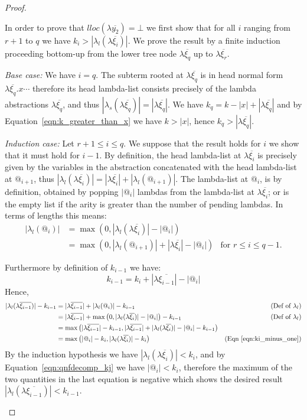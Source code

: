 \documentclass{article}
\theoremstyle{definition}
\begin{document}
\begin{proof}
\begin{enumerate}
In order to prove that $lloc(\lambda\overline{y_2}) =\bot$ we first show that for all $i$ ranging from $r+1$ to $q$ we have
 $k_i>|\lambda_l(\lambda\overline{\xi_i})|$. We prove the result by a finite induction proceeding bottom-up from the lower tree node
 $\lambda\overline{\xi_q}$ up to $\lambda\overline{\xi_r}$.

\emph{Base case:} We have $i=q$. The subterm
rooted at $\lambda\overline{\xi_q}$ is in head normal form
$\lambda\overline{\xi_q}. x \cdots$ therefore its head lambda-list consists precisely of the lambda abstractions $\lambda\overline{\xi_q}$, and thus
$|\lambda_s(\lambda\overline{\xi_q})| = |\lambda\overline{\xi_q}|$.
We have $k_q = k -|x| + |\lambda\overline{\xi_q}|$ and by Equation~\ref{eqn:k_greater_than_x} we have $k>|x|$, hence $k_q >|\lambda\overline{\xi_q}|$.


\emph{Induction case:} Let $r+1\leq i \leq q$. We suppose that the result holds for $i$ we show that it must hold for $i-1$. By definition, the head lambda-list at $\lambda\overline{\xi_i}$ is precisely given by the variables in the abstraction concatenated with the head lambda-list at $@_{i+1}$, thus $|\lambda_l(\lambda\overline{\xi_i})| =
|\lambda\overline{\xi_i}| + |\lambda_l(@_{i+1})|$. The lambda-list at $@_i$, is by definition, obtained by popping $|@_i|$ lambdas from the lambda-list at $\lambda\overline{\xi_i}$; or is the empty list if the arity is greater than the number of pending lambdas. In terms of lengths this means:
\begin{align*}
    |\lambda_l(@_i)| &= \max(0, |\lambda_l(\lambda\overline{\xi_i})| - |@_i|) \\
     &= \max\left( 0, |\lambda_l(@_{i+1})| + |\lambda\overline{\xi_i}| - |@_i| \right) & \mbox{for $r\leq i \leq q-1$.}
\end{align*}

Furthermore by definition of $k_{i-1}$ we have:
\begin{equation}
k_{i-1} = k_i + |\lambda\overline{\xi_{i-1}}| - |@_i| \label{eqn:ki_minus_one}
\end{equation}
Hence,
\begin{align*}
    |\lambda_l(\lambda\overline{\xi_{i-1}})| - k_{i-1}
    &= |\lambda\overline{\xi_{i-1}}| +|\lambda_l(@_i)| - k_{i-1} &\mbox{(Def~of $\lambda_l$)}\\
    &= |\lambda\overline{\xi_{i-1}}| + \max\left( 0, |\lambda_l(\lambda\overline{\xi_i})| - |@_i| \right) - k_{i-1} &\mbox{(Def~of $\lambda_l$)}\\
    &= \max\left( |\lambda\overline{\xi_{i-1}}| - k_{i-1},    |\lambda\overline{\xi_{i-1}}| + |\lambda_l(\lambda\overline{\xi_i})| - |@_i| - k_{i-1} \right) \\
    &= \max\left(  |@_i|- k_i, |\lambda_l(\lambda\overline{\xi_i})| - k_i \right) &\mbox{(Eqn~\ref{eqn:ki_minus_one})}
\end{align*}
By the induction hypothesis we have $|\lambda_l(\lambda\overline{\xi_i})| < k_i$, and by Equation~\ref{eqn:qnfdecomp_kj} we have $ |@_i|< k_i$, therefore the maximum of the two quantities in the last equation is negative which shows
the desired result $|\lambda_l(\lambda\overline{\xi_{i-1}})| < k_{i-1}$.


\end{enumerate}
\end{proof}
\end{document}
